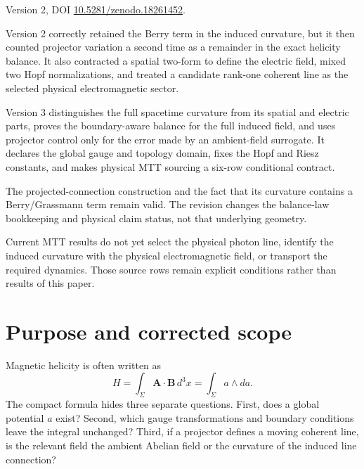 \documentclass[11pt]{article}
\begin{document}
\begin{description}[leftmargin=2.8cm,style=nextline]
\item[Supersedes.]
Version 2, DOI \href{https://doi.org/10.5281/zenodo.18261452}
{10.5281/zenodo.18261452}.

\item[Reason.]
Version 2 correctly retained the Berry term in the induced curvature, but it
then counted projector variation a second time as a remainder in the exact
helicity balance.  It also contracted a spatial two-form to define the
electric field, mixed two Hopf normalizations, and treated a candidate
rank-one coherent line as the selected physical electromagnetic sector.

\item[Resolution.]
Version 3 distinguishes the full spacetime curvature from its spatial and
electric parts, proves the boundary-aware balance for the full induced field,
and uses projector control only for the error made by an ambient-field
surrogate.  It declares the global gauge and topology domain, fixes the Hopf
and Riesz constants, and makes physical MTT sourcing a six-row conditional
contract.

\item[Retained content.]
The projected-connection construction and the fact that its curvature contains
a Berry/Grassmann term remain valid.  The revision changes the balance-law
bookkeeping and physical claim status, not that underlying geometry.

\item[Open boundary.]
Current MTT results do not yet select the physical photon line, identify the
induced curvature with the physical electromagnetic field, or transport the
required dynamics.  Those source rows remain explicit conditions rather than
results of this paper.
\end{description}

\section{Purpose and corrected scope}

Magnetic helicity is often written as
\[
H=\int_\Sigma \bm A\cdot\bm B\,d^3x
  =\int_\Sigma a\wedge da.
\]
The compact formula hides three separate questions.  First, does a global
potential \(a\) exist?  Second, which gauge transformations and boundary
conditions leave the integral unchanged?  Third, if a projector defines a
moving coherent line, is the relevant field the ambient Abelian field or the
curvature of the induced line connection?
\end{document}
